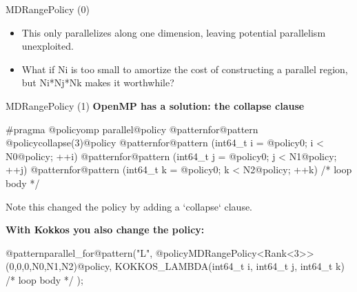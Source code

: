 \begin{frame}[fragile]{MDRangePolicy (0)}
  \begin{itemize}
    \item{\small{This only parallelizes along one dimension, leaving potential parallelism unexploited.}}
    \item{\small{What if Ni is too small to amortize the cost of constructing a parallel region, but Ni*Nj*Nk makes it worthwhile?}}
  \end{itemize}




\end{frame}


\begin{frame}[fragile]{MDRangePolicy (1)}
   \textbf{OpenMP has a solution: the collapse clause}

  \begin{code}[linebackgroundcolor={
        \btLstHL<1->{5}{bodyColor}
      },
      frame=single
    ]
#pragma @policyomp parallel@policy @patternfor@pattern @policycollapse(3)@policy
@patternfor@pattern (int64_t i = @policy0; i < N0@policy; ++i) {
  @patternfor@pattern (int64_t j = @policy0; j < N1@policy; ++j) {
    @patternfor@pattern (int64_t k = @policy0; k < N2@policy; ++k) {
      /* loop body */
    }
  }
}
  \end{code}

  \pause

Note this changed the policy by adding a `collapse` clause.

\pause

	\vspace{0.5cm}

	\textbf{With Kokkos you also change the policy:}

  \begin{code}[linebackgroundcolor={
        \btLstHL<1->{3}{bodyColor}
      },
      frame=single
    ]
@patternparallel_for@pattern("L", @policyMDRangePolicy<Rank<3>>({0,0,0},{N0,N1,N2})@policy, 
   KOKKOS_LAMBDA(int64_t i, int64_t j, int64_t k) {
     /* loop body */
});
  \end{code}

\end{frame}


